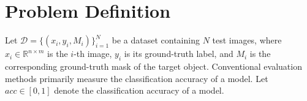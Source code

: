 \documentclass[a4paper,fleqn]{cas-dc}
\begin{document}
	

    
%
%	

	
	\section{Problem Definition}
	\label{sec:problem_def}
	Let  $\mathcal{D}=\{(x_i,y_i,M_i)\}_{i=1}^{N}$ be a dataset containing $N$ test images, where $x_i\in \mathbb R^{n\times m}$ is the $i$-th image, $y_i$ is its ground-truth label, and $M_i$ is the corresponding ground-truth mask of the target object. 
	Conventional evaluation methods primarily measure the classification accuracy of a model. 
	Let $acc\in[0,1]$ denote the classification accuracy of a model. 
	
\end{document}
